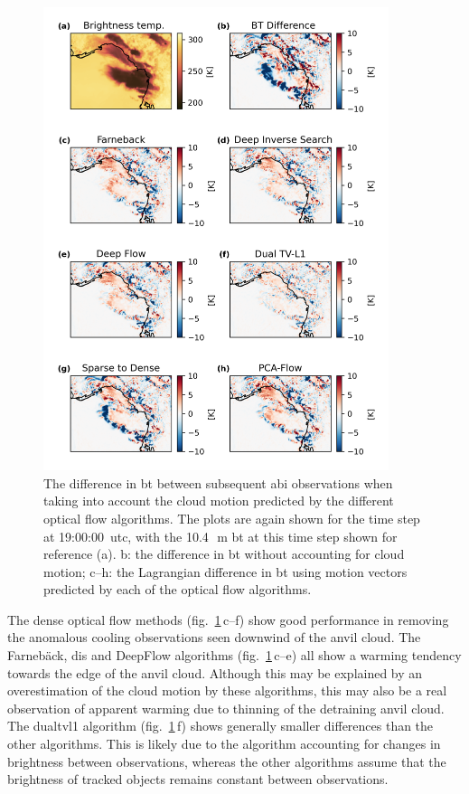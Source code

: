 \begin{figure}[tp]
    \centering
    \includegraphics[width=0.9\textwidth]{figures/chapter1_11.png}
    \caption[
    The difference in \acrshort{bt} between subsequent \acrshort{abi} observations when taking into account the cloud motion predicted by the different optical flow algorithms.
    ]{
    The difference in \acrshort{bt} between subsequent \acrshort{abi} observations when taking into account the cloud motion predicted by the different optical flow algorithms. The plots are again shown for the time step at 19:00:00~\acrshort{utc}, with the 10.4\,\unit{\mu m} \acrshort{bt} at this time step shown for reference (a). b: the difference in \acrshort{bt} without accounting for cloud motion; c--h: the Lagrangian difference in \acrshort{bt} using motion vectors predicted by each of the optical flow algorithms.
    }
    \label{fig:opt_flow_differences}
\end{figure}


The dense optical flow methods (fig.~\ref{fig:opt_flow_differences}\,c--f) show good performance in removing the anomalous cooling observations seen downwind of the anvil cloud.
The Farnebäck, \acrshort{dis} and DeepFlow algorithms (fig.~\ref{fig:opt_flow_differences}\,c--e) all show a warming tendency towards the edge of the anvil cloud.
Although this may be explained by an overestimation of the cloud motion by these algorithms, this may also be a real observation of apparent warming due to thinning of the detraining anvil cloud.
The \acrshort{dualtvl1} algorithm (fig.~\ref{fig:opt_flow_differences}\,f) shows generally smaller differences than the other algorithms.
This is likely due to the algorithm accounting for changes in brightness between observations, whereas the other algorithms assume that the brightness of tracked objects remains constant between observations.

